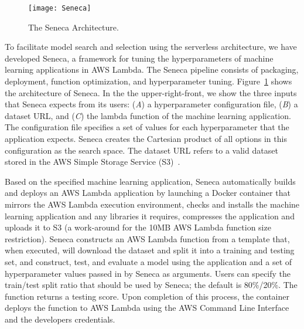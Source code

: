\begin{figure}[t] \centering 
\texttt{[image: Seneca]}
\caption{The Seneca Architecture.
\label{fig:seneca}}
\vspace{-0.2in}
\end{figure}

To facilitate model search and selection using the serverless
architecture, we have developed Seneca, a framework for tuning the
hyperparameters of machine learning applications in AWS Lambda.  The
Seneca pipeline consists of packaging, deployment, function
optimization, and hyperparameter tuning. Figure~\ref{fig:seneca} shows
the architecture of Seneca.  In the the upper-right-front, we show the
three inputs that Seneca expects from its users: (\textit{A}) a
hyperparameter configuration file, (\textit{B}) a dataset URL, and
(\textit{C}) the lambda function of the machine learning
application. The configuration file specifies a set of values for
each hyperparameter that the application expects. Seneca creates the
Cartesian product of all options in this configuration as
the search space. The dataset URL refers to a valid dataset stored in
the AWS Simple Storage Service (S3)~\cite{ref:awss3}.

Based on the specified machine learning application, Seneca
automatically builds and deploys an AWS Lambda application by
launching a Docker container that mirrors the AWS Lambda execution
environment, checks and installs the machine learning application and
any libraries it requires, compresses the application and uploads it
to S3 (a
work-around for the 10MB AWS Lambda function size restriction).
Seneca constructs an AWS Lambda function from a template that, when
executed, will download the dataset and split it into a training and
testing set, and construct, test, and evaluate a model using the
application and a set of hyperparameter values passed in by Seneca as
arguments.  Users can specify the train/test split ratio that should
be used by Seneca; the default is 80\%/20\%.  The function returns a
testing score.  Upon completion of this process, the container deploys
the function to AWS Lambda using the AWS Command Line
Interface~\cite{ref:awscli}
and the developers credentials.



